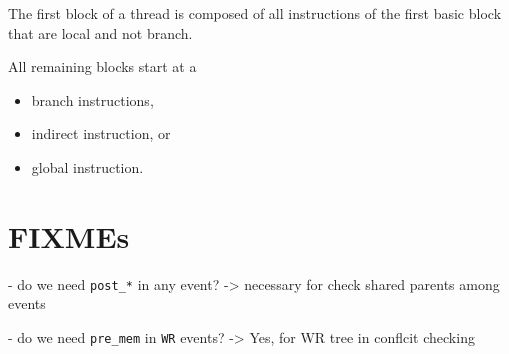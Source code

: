 \documentclass{llncs}
\begin{document}
The first block of a thread is composed of all instructions of the first basic
block that are local and not branch.

All remaining blocks start at a
\begin{itemize}
\item branch instructions,
\item indirect instruction, or
\item global instruction.
\end{itemize}

\section{FIXMEs}

- do we need \verb!post_*! in any event? -> necessary for check shared parents among events

- do we need \verb!pre_mem! in \verb!WR! events? -> Yes, for WR tree in conflcit checking

\newpage



\end{document}
